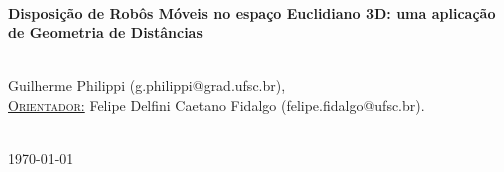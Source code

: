 \documentclass[a4paper,12pt]{article}
\begin{document}
\begin{titlepage}
		
		
		\HRule \\[0.4cm]
		{ \LARGE \bfseries \textbf{Disposição de Robôs Móveis no espaço Euclidiano 3D: uma aplicação de Geometria de Distâncias}} \\ [0.4cm] %
		\HRule \\[2cm]
		
		
		\begin{minipage}{1\textwidth}
			\begin{center} \large
				Guilherme Philippi (g.philippi@grad.ufsc.br),
				\vspace{0.5cm}
				\\
				\underline{\textsc{Orientador:}} \vspace{0.2cm}
				Felipe Delfini Caetano Fidalgo (felipe.fidalgo@ufsc.br).
			\end{center}
		\end{minipage} \\[2cm]
		
		
		{\large \today} %
		
		
		\vfill %
		
	\end{titlepage}
	
	
	\newpage
	\vspace{-1cm}
	\tableofcontents
	\newpage
	
\end{document}
